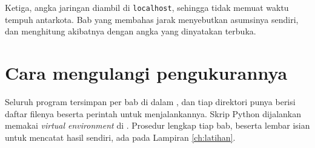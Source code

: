Ketiga, angka jaringan diambil di \texttt{localhost}, sehingga tidak memuat
waktu tempuh antarkota. Bab yang membahas jarak menyebutkan asumsinya
sendiri, dan menghitung akibatnya dengan angka yang dinyatakan terbuka.

\section*{Cara mengulangi pengukurannya}

Seluruh program tersimpan per bab di dalam , dan tiap
direktori punya  berisi daftar filenya beserta perintah
untuk menjalankannya. Skrip Python dijalankan memakai \textit{virtual
environment} di . Prosedur lengkap tiap bab, beserta
lembar isian untuk mencatat hasil sendiri, ada pada Lampiran
\ref{ch:latihan}.
